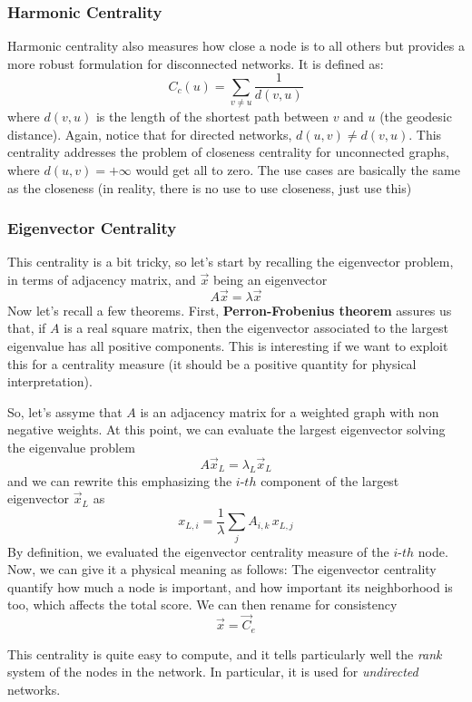 \documentclass[12pt,a4paper]{article}
\begin{document}
\subsubsection*{Harmonic Centrality}
Harmonic centrality also measures how close a node is to all others but provides a more robust formulation for disconnected networks. It is defined as:
$$
C_c(u) = \sum_{v\neq u}\frac{1}{d(v,u)}
$$
where $d(v,u)$ is the length of the shortest path between $v$ and $u$ (the geodesic distance).
Again, notice that for directed networks, $d(u,v)\neq d(v,u)$.
This centrality addresses the problem of closeness centrality for unconnected graphs, where $d(u,v)=+\infty$ would get all to zero. The use cases are basically the same as the closeness (in reality, there is no use to use closeness, just use this)


\subsubsection*{Eigenvector Centrality}
This centrality is a bit tricky, so let's start by recalling the eigenvector problem, in terms of adjacency matrix, and $\vec{x}$ being an eigenvector
$$
A\vec{x} = \lambda \vec{x}
$$
Now let's recall a few theorems. First, \textbf{Perron-Frobenius theorem} assures us that, if $A$ is a real square matrix, then the eigenvector associated to the largest eigenvalue has all positive components. This is interesting if we want to exploit this for a centrality measure (it should be a positive quantity for physical interpretation).

So, let's assyme that $A$ is an adjacency matrix for a weighted graph with non negative weights. At this point, we can evaluate the largest eigenvector solving the eigenvalue problem
$$
A \vec{x}_L = \lambda_L \vec{x}_L
$$
and we can rewrite this emphasizing the $i$-$th$ component of the largest eigenvector $\vec{x}_L$ as
$$
x_{L,i} = \frac{1}{\lambda}\sum_{j} A_{i,k}\,x_{L,j}
$$
By definition, we evaluated the eigenvector centrality measure of the $i$-$th$ node. Now, we can give it a physical meaning as follows:
The eigenvector centrality quantify how much a node is important, and how important its neighborhood is too, which affects the total score.
We can then rename for consistency
$$
\vec{x} =\vec{C}_e
$$

This centrality is quite easy to compute, and it tells particularly well the \textit{rank} system of the nodes in the network. In particular, it is used for \textit{undirected} networks.
\end{document}
